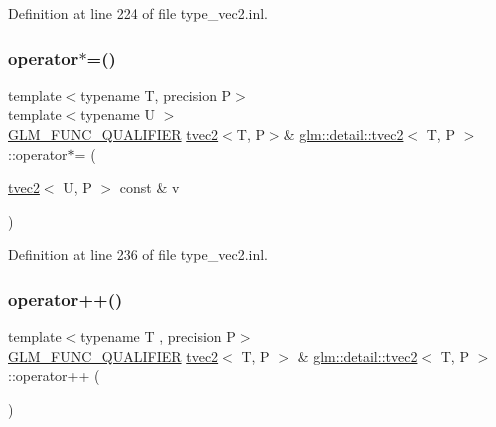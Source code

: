 Definition at line 224 of file type\+\_\+vec2.\+inl.

\mbox{\label{structglm_1_1detail_1_1tvec2_a74848e484fd662c04e7193575af09d97}} 
\subsubsection{\texorpdfstring{operator$\ast$=()}{operator*=()}\hspace{0.1cm}{\footnotesize\ttfamily [4/4]}}
{\footnotesize\ttfamily template$<$typename T, precision P$>$ \\
template$<$typename U $>$ \\
\hyperlink{setup_8hpp_a33fdea6f91c5f834105f7415e2a64407}{G\+L\+M\+\_\+\+F\+U\+N\+C\+\_\+\+Q\+U\+A\+L\+I\+F\+I\+ER} \hyperlink{structglm_1_1detail_1_1tvec2}{tvec2}$<$T, P$>$\& \hyperlink{structglm_1_1detail_1_1tvec2}{glm\+::detail\+::tvec2}$<$ T, P $>$\+::operator$\ast$= (\begin{DoxyParamCaption}\item[{\hyperlink{structglm_1_1detail_1_1tvec2}{tvec2}$<$ U, P $>$ const \&}]{v }\end{DoxyParamCaption})}



Definition at line 236 of file type\+\_\+vec2.\+inl.

\mbox{\label{structglm_1_1detail_1_1tvec2_a9678bb2f72ed6a99f99ada6aab54a0ad}} 
\subsubsection{\texorpdfstring{operator++()}{operator++()}\hspace{0.1cm}{\footnotesize\ttfamily [1/2]}}
{\footnotesize\ttfamily template$<$typename T , precision P$>$ \\
\hyperlink{setup_8hpp_a33fdea6f91c5f834105f7415e2a64407}{G\+L\+M\+\_\+\+F\+U\+N\+C\+\_\+\+Q\+U\+A\+L\+I\+F\+I\+ER} \hyperlink{structglm_1_1detail_1_1tvec2}{tvec2}$<$ T, P $>$ \& \hyperlink{structglm_1_1detail_1_1tvec2}{glm\+::detail\+::tvec2}$<$ T, P $>$\+::operator++ (\begin{DoxyParamCaption}{ }\end{DoxyParamCaption})}




